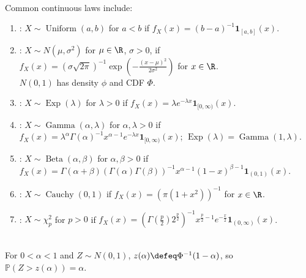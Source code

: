 \begin{definition} \label{def:core-continuous-distributions} \\
Common continuous laws include:
\begin{enumerate}[label=(\roman*)]
\setlength{\itemsep}{0pt}
\item {}: $X\sim\operatorname{Uniform}(a,b)$ for $a<b$ if $f_X(x)=(b-a)^{-1}\mathbf{1}_{[a,b]}(x)$.
\item {}: $X\sim N(\mu,\sigma^2)$ for $\mu\in\R$, $\sigma>0$, if $f_X(x)=(\sigma\sqrt{2\pi})^{-1}\exp(-\frac{(x-\mu)^2}{2\sigma^2})$ for $x\in\R$.\\
$N(0,1)$ has density $\phi$ and CDF $\Phi$.
\item {}: $X\sim\operatorname{Exp}(\lambda)$ for $\lambda>0$ if $f_X(x)=\lambda e^{-\lambda x}\mathbf{1}_{[0,\infty)}(x)$.
\item {}: $X\sim\operatorname{Gamma}(\alpha,\lambda)$ for $\alpha,\lambda>0$ if $f_X(x)=\lambda^\alpha\Gamma(\alpha)^{-1}x^{\alpha-1}e^{-\lambda x}\mathbf{1}_{[0,\infty)}(x)$; $\operatorname{Exp}(\lambda)=\operatorname{Gamma}(1,\lambda)$.
\item {}: $X\sim\operatorname{Beta}(\alpha,\beta)$ for $\alpha,\beta>0$ if $f_X(x)=\Gamma(\alpha+\beta)(\Gamma(\alpha)\Gamma(\beta))^{-1}x^{\alpha-1}(1-x)^{\beta-1}\mathbf{1}_{(0,1)}(x)$.
\item {}: $X\sim\operatorname{Cauchy}(0,1)$ if $f_X(x)=(\pi(1+x^2))^{-1}$ for $x\in\R$.
\item {}: $X\sim\chi_p^2$ for $p>0$ if $f_X(x)=(\Gamma(\frac{p}{2})2^{\frac{p}{2}})^{-1}x^{\frac{p}{2}-1}e^{-\frac{x}{2}}\mathbf{1}_{(0,\infty)}(x)$.
\end{enumerate}
\end{definition}

\begin{definition} \label{def:normal-right-tail-quantile} \\
For $0<\alpha<1$ and $Z\sim N(0,1)$, $z(\alpha)\defeq\Phi^{-1}(1-\alpha)$, so $\mathbb{P}(Z>z(\alpha))=\alpha$.
\end{definition}

